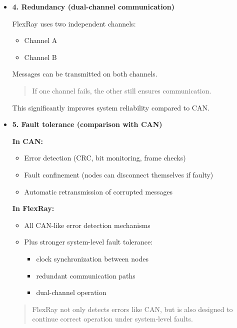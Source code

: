 \begin{itemize}
No arbitration-induced delay variation and no unexpected timing jitter under load.

\item \textbf{4. Redundancy (dual-channel communication)}

FlexRay uses two independent channels:

\begin{itemize}
    \item Channel A
    \item Channel B
\end{itemize}

Messages can be transmitted on both channels.

\begin{quote}
If one channel fails, the other still ensures communication.
\end{quote}

This significantly improves system reliability compared to CAN.

\item \textbf{5. Fault tolerance (comparison with CAN)}

\textbf{In CAN:}
\begin{itemize}
    \item Error detection (CRC, bit monitoring, frame checks)
    \item Fault confinement (nodes can disconnect themselves if faulty)
    \item Automatic retransmission of corrupted messages
\end{itemize}

\textbf{In FlexRay:}
\begin{itemize}
    \item All CAN-like error detection mechanisms
    \item Plus stronger system-level fault tolerance:
    \begin{itemize}
        \item clock synchronization between nodes
        \item redundant communication paths
        \item dual-channel operation
    \end{itemize}
\end{itemize}

\begin{quote}
FlexRay not only detects errors like CAN, but is also designed to continue correct operation under system-level faults.
\end{quote}

\end{itemize}



